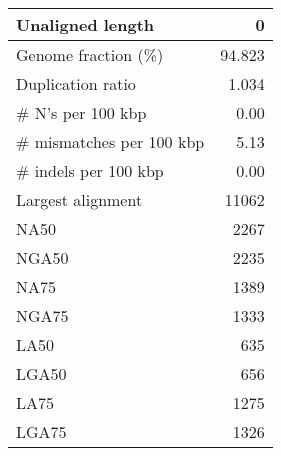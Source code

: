 \documentclass[12pt,a4paper]{article}
\begin{document}
\begin{table}[ht]
\begin{center}
\begin{tabular}{|l*{1}{|r}|}
Unaligned length & 0 \\ \hline
Genome fraction (\%) & 94.823 \\ \hline
Duplication ratio & 1.034 \\ \hline
\# N's per 100 kbp & 0.00 \\ \hline
\# mismatches per 100 kbp & 5.13 \\ \hline
\# indels per 100 kbp & 0.00 \\ \hline
Largest alignment & 11062 \\ \hline
NA50 & 2267 \\ \hline
NGA50 & 2235 \\ \hline
NA75 & 1389 \\ \hline
NGA75 & 1333 \\ \hline
LA50 & 635 \\ \hline
LGA50 & 656 \\ \hline
LA75 & 1275 \\ \hline
LGA75 & 1326 \\ \hline
\end{tabular}
\end{center}
\end{table}
\end{document}
